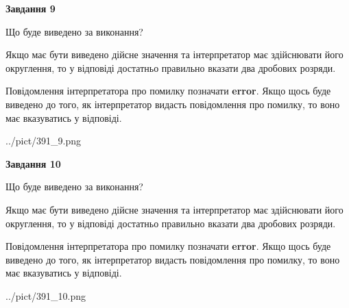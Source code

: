 \documentclass[12pt, ukrainian]{article}
\begin{document}
{\begin {Large}
{\begin {center}\textbf{Завдання 9}\end {center}}\par
Що буде виведено за виконання? \par

Якщо має бути виведено дійсне значення та інтерпретатор має здійснювати його округлення, 
то у відповіді достатньо правильно вказати два дробових розряди.

Повідомлення інтерпретатора про помилку позначати \textbf{error}.
Якщо щось буде виведено до того, як інтерпретатор видасть повідомлення про помилку, 
то воно має вказуватись у відповіді. \par

\begin{center}
	{../pict/391_9.png}
\end{center}
\newpage

{\begin {center}\textbf{Завдання 10}\end {center}}\par
Що буде виведено за виконання? \par

Якщо має бути виведено дійсне значення та інтерпретатор має здійснювати його округлення, 
то у відповіді достатньо правильно вказати два дробових розряди.

Повідомлення інтерпретатора про помилку позначати \textbf{error}.
Якщо щось буде виведено до того, як інтерпретатор видасть повідомлення про помилку, 
то воно має вказуватись у відповіді. \par

\begin{center}
	{../pict/391_10.png}
\end{center}
\newpage

\end {Large}}
\end{document}
